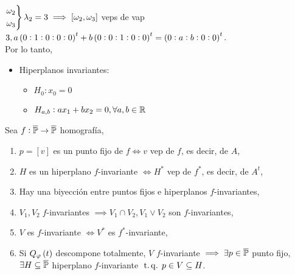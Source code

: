 \begin{example}
    \indent $\begin{rcases} \omega_2 \\ \omega_3 \end{rcases} \lambda_2 = 3 \implies [\omega_2, \omega_3]$ veps de vap $3, a\left(0:1:0:0:0\right)^t + b\left(0:0:1:0:0\right)^t = \left( 0:a:b:0:0\right)^t$. \\
    Por lo tanto,
    \begin{itemize}
        \item Hiperplanos invariantes:
        \begin{itemize}
            \item $H_0 : x_0 = 0$
            \item $H_{a,b} : ax_1 + bx_2 = 0, \forall a, b \in \mathbb{R}$
        \end {itemize}
    \end{itemize}
\end{example}
\begin{prop}
    Sea $f : \overline{\mathbb{P}} \to \overline{\mathbb{P}}$ homografía,
    \begin{enumerate}[(1)]
        \item \label{item:1_homografias} $p = [v]$ es un punto fijo de $f \iff v$ vep de $f$, es decir, de $A$,
        \item \label{item:2_homografias} $H$ es un hiperplano $f$-invariante $\iff H^*$ vep de $f^*$, es decir, de $A^t$,
        \item Hay una biyección entre puntos fijos e hiperplanos $f$-invariantes,
        \item $V_1, V_2\; f$-invariantes $\implies V_1 \cap V_2, V_1 \vee V_2$ son $f$-invariantes,
        \item \label{item:5_homografias} $V$ es $f$-invariante $\iff V^*$ es $f^*$-invariante,
        \item Si $Q_\varphi \left( t\right)$ descompone totalmente, $V$ $f$-invariante $\implies \exists p\in \overline{\mathbb{P}}$ punto fijo, $\exists H\subseteq\overline{\mathbb{P}}$ hiperplano $f$-invariante $\operatorname{\;t.q.\;} p \in V \subseteq H$.
    \end{enumerate}
\end{prop}

